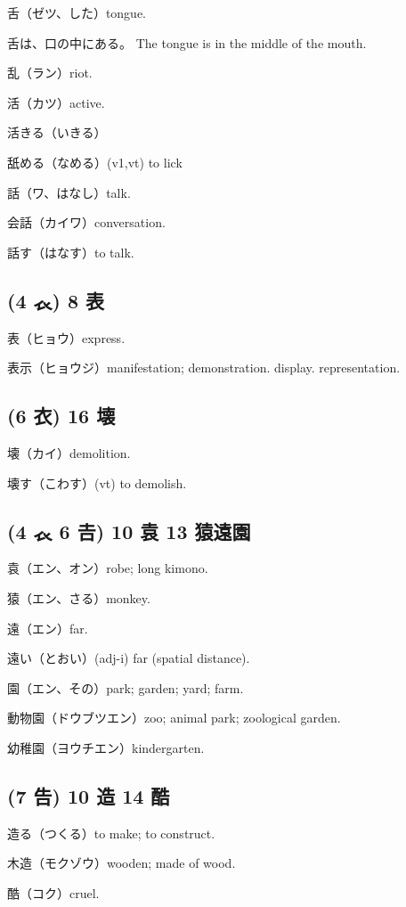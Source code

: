 舌（ゼツ、した）tongue.

舌は、口の中にある。
The tongue is in the middle of the mouth.

乱（ラン）riot.

活（カツ）active.

活きる（いきる）

舐める（なめる）(v1,vt) to lick

話（ワ、はなし）talk.

会話（カイワ）conversation.

話す（はなす）to talk.

\subsection{(4 𧘇) 8 表}

表（ヒョウ）express.

表示（ヒョウジ）manifestation; demonstration. display. representation.

\subsection{(6 衣) 16 壊}

壊（カイ）demolition.

壊す（こわす）(vt) to demolish.

\subsection{(4 𧘇 6 𠮷) 10 袁 13 猿遠園}

袁（エン、オン）robe; long kimono.

猿（エン、さる）monkey.

遠（エン）far.

遠い（とおい）(adj-i) far (spatial distance).

園（エン、その）park; garden; yard; farm.

動物園（ドウブツエン）zoo; animal park; zoological garden.

幼稚園（ヨウチエン）kindergarten.

\subsection{(7 告) 10 造 14 酷}

造る（つくる）to make; to construct.

木造（モクゾウ）wooden; made of wood.

酷（コク）cruel.

